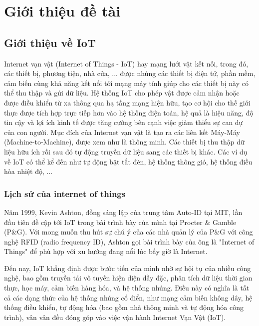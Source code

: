 \chapter{Giới thiệu đề tài}

\section{Giới thiệu về IoT}
Internet vạn vật (Internet of Things - IoT) hay mạng lưới vật kết nối, trong đó, các thiết bị, phương tiện, nhà cửa, ... được nhúng các thiết bị điện tử, phần mềm, cảm biến cùng khả năng kết nối tới mạng máy tính giúp cho các thiết bị này có thể thu thập và gửi dữ liệu. Hệ thống IoT cho phép vật được cảm nhận hoặc được điều khiển từ xa thông qua hạ tầng mạng hiện hữu, tạo cơ hội cho thế giới thực được tích hợp trực tiếp hơn vào hệ thống điện toán, hệ quả là hiệu năng, độ tin cậy và lợi ích kinh tế được tăng cường bên cạnh việc giảm thiểu sự can dự của con người. Mục đích của Internet vạn vật là tạo ra các liên kết Máy-Máy (Machine-to-Machine), được xem như là thông minh. Các thiết bị thu thập dữ liệu hữu ích rồi sau đó tự động truyền dữ liệu sang các thiết bị khác. Các ví dụ về IoT có thể kể đến như tự động bật tắt đèn, hệ thống thông gió, hệ thống điều hòa nhiệt độ, ... 

\subsection{Lịch sử của internet of things}
Năm 1999, Kevin Ashton, đồng sáng lập của trung tâm Auto-ID tại MIT, lần đầu tiên đề cập tới IoT trong bài trình bày của mình tại Procter \& Gamble (P\&G). Với mong muốn thu hút sự chú ý của các nhà quản lý của P\&G với công nghệ RFID (radio frequency ID), Ashton gọi bài trình bày của ông là "Internet of Things" để phù hợp với xu hướng đang nổi lúc bấy giờ là Internet. 

Đến  nay, IoT khẳng định được bước tiến của mình nhờ sự hội tụ của nhiều công nghệ, bao gồm truyền tải vô tuyến hiện diện dầy đặc, phân tích dữ liệu thời gian thực, học máy, cảm biến hàng hóa, và hệ thống nhúng. Điều này có nghĩa là tất cả các dạng thức của hệ thống nhúng cổ điển, như mạng cảm biến không dây, hệ thống điều khiển, tự động hóa (bao gồm nhà thông minh và tự động hóa công trình), vân vân đều đóng góp vào việc vận hành Internet Vạn Vật (IoT). 

